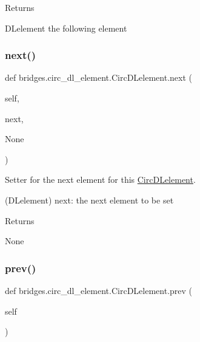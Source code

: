 \begin{DoxyReturn}{Returns}


D\+Lelement the following element 
\end{DoxyReturn}
\mbox{\label{classbridges_1_1circ__dl__element_1_1_circ_d_lelement_a842efa9c0ad878fe34b343600a23d9aa}} 
\subsubsection{\texorpdfstring{next()}{next()}\hspace{0.1cm}{\footnotesize\ttfamily [2/2]}}
{\footnotesize\ttfamily def bridges.\+circ\+\_\+dl\+\_\+element.\+Circ\+D\+Lelement.\+next (\begin{DoxyParamCaption}\item[{}]{self,  }\item[{}]{next,  }\item[{}]{None }\end{DoxyParamCaption})}



Setter for the next element for this \hyperlink{classbridges_1_1circ__dl__element_1_1_circ_d_lelement}{Circ\+D\+Lelement}. 

(D\+Lelement) next\+: the next element to be set \begin{DoxyReturn}{Returns}


None 
\end{DoxyReturn}
\mbox{\label{classbridges_1_1circ__dl__element_1_1_circ_d_lelement_aa2ebe17f407680a6a4fc886ef9516d61}} 
\subsubsection{\texorpdfstring{prev()}{prev()}\hspace{0.1cm}{\footnotesize\ttfamily [1/2]}}
{\footnotesize\ttfamily def bridges.\+circ\+\_\+dl\+\_\+element.\+Circ\+D\+Lelement.\+prev (\begin{DoxyParamCaption}\item[{}]{self }\end{DoxyParamCaption})}



